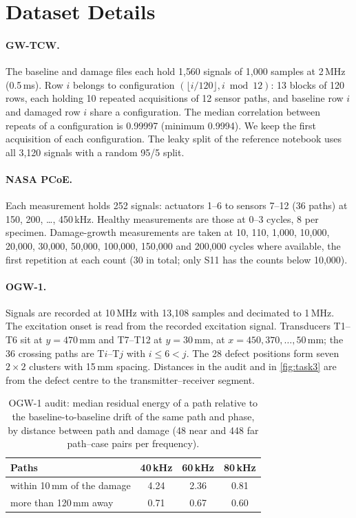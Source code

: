 \documentclass{article}
\begin{document}
\section{Dataset Details}
\label{app:data}

\paragraph{GW-TCW.} The baseline and damage files each hold 1{,}560 signals of 1{,}000 samples at 2\,MHz
(0.5\,ms). Row $i$ belongs to configuration $(\lfloor i/120\rfloor, i \bmod 12)$: 13 blocks of 120 rows,
each holding 10 repeated acquisitions of 12 sensor paths, and baseline row $i$ and damaged row $i$ share
a configuration. The median correlation between repeats of a configuration is 0.99997 (minimum 0.9994).
We keep the first acquisition of each configuration. The leaky split of the reference notebook uses all
3{,}120 signals with a random 95/5 split.

\paragraph{NASA PCoE.} Each measurement holds 252 signals: actuators 1--6 to sensors 7--12 (36 paths) at
150, 200, \dots, 450\,kHz. Healthy measurements are those at 0--3 cycles, 8 per specimen. Damage-growth
measurements are taken at 10, 110, 1{,}000, 10{,}000, 20{,}000, 30{,}000, 50{,}000, 100{,}000, 150{,}000 and
200{,}000 cycles where available, the first repetition at each count (30 in total; only S11 has the counts
below 10{,}000).

\paragraph{OGW-1.} Signals are recorded at 10\,MHz with 13{,}108 samples and decimated to 1\,MHz. The
excitation onset is read from the recorded excitation signal. Transducers T1--T6 sit at $y=470$\,mm and
T7--T12 at $y=30$\,mm, at $x=450, 370, \dots, 50$\,mm; the 36 crossing paths are T$i$--T$j$ with
$i\le 6<j$. The 28 defect positions form seven $2\times2$ clusters with 15\,mm spacing. Distances in the
audit and in \cref{fig:task3} are from the defect centre to the transmitter--receiver segment.

\begin{table}[H]
  \caption{OGW-1 audit: median residual energy of a path relative to the baseline-to-baseline drift of the
  same path and phase, by distance between path and damage (48 near and 448 far path--case pairs per
  frequency).}
  \label{tab:audit}
  \centering
  \small
  \begin{tabular}{@{}lccc@{}}
    \toprule
    Paths & 40\,kHz & 60\,kHz & 80\,kHz \\
    \midrule
    within 10\,mm of the damage & 4.24 & 2.36 & 0.81 \\
    more than 120\,mm away & 0.71 & 0.67 & 0.60 \\
    \bottomrule
  \end{tabular}
\end{table}
\end{document}
